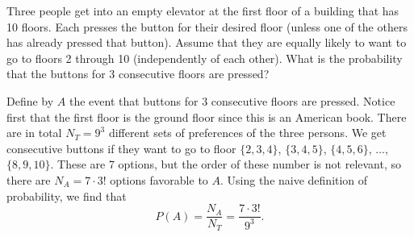 
\setcounter{theorem}{13}
\begin{exercise}[BH.1.23]
    Three people get into an empty elevator at the first floor of a building that has 10 floors. Each presses the button for their desired floor (unless one of the others has already pressed that button). Assume that they are equally likely to want to go to floors 2 through 10 (independently of each other). What is the probability that the buttons for 3 consecutive floors are pressed?
\begin{solution}
    Define by $A$ the event that buttons for 3 consecutive floors are pressed. Notice first that the first floor is the ground floor since this is an American book. There are in total $N_{T}=9^3$ different sets of preferences of the three persons. We get consecutive buttons if they want to go to floor $\{2,3,4\}$, $\{3,4,5\}$, $\{4,5,6\}$, $\ldots$, $\{8,9,10\}$. These are 7 options, but the order of these number is not relevant, so there are $N_{A}=7\cdot 3!$ options favorable to $A$. Using the naive definition of probability, we find that $$P(A) = \frac{N_{A}}{N_{T}} = \frac{7\cdot 3!}{9^3}.$$
\end{solution}
\end{exercise}


